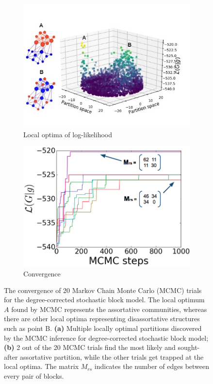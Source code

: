 \begin{figure}[!htb]
\centering
\begin{subfigure}{.5\textwidth} 
\centering
\includegraphics[width=.99\linewidth]{img/chap2/opt_figure_dcsbm.jpg}
\caption{Local optima of log-likelihood}
\end{subfigure}
\begin{subfigure}{.45\textwidth} 
\centering
\includegraphics[width=.99\linewidth]{img/chap2/dcsbm_converge2.png}
\caption{Convergence}
\end{subfigure}
\caption{The convergence of 20 Markov Chain Monte Carlo (MCMC) trials for the degree-corrected stochastic block model. The local optimum $A$ found by MCMC represents the assortative communities, whereas there are other local optima representing disassortative structures such as point B. \textbf{(a)} Multiple locally optimal partitions discovered by the MCMC inference for degree-corrected stochastic block model; \textbf{(b)} 2 out of the 20 MCMC trials find the most likely and sought-after assortative partition, while the other trials get trapped at the local optima. The matrix $M_{rs}$ indicates the number of edges between every pair of blocks.}
\label{fig:dcsbm_3dscatter}
\end{figure}

